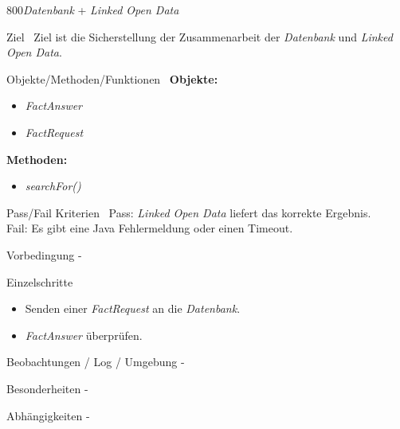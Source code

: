 \begin{testcase}{800}{\textit{Datenbank} + \textit{Linked Open Data}}

\item[Ziel]\
Ziel ist die Sicherstellung der Zusammenarbeit der \textit{Datenbank} und \textit{Linked Open Data}.
\item[Objekte/Methoden/Funktionen]\
\textbf{Objekte: }
\begin{itemize}
\item \textit{FactAnswer}
\item \textit{FactRequest}
\end{itemize}

\textbf{Methoden: }
\begin{itemize}
\item \textit{searchFor()}
\end{itemize}
\item[Pass/Fail Kriterien]\ 
Pass: \textit{Linked Open Data} liefert das korrekte Ergebnis.\\
Fail: Es gibt eine Java Fehlermeldung oder einen Timeout.
\item[Vorbedingung] -
\item[Einzelschritte]
\begin{itemize}
\item Senden einer \textit{FactRequest} an die \textit{Datenbank}.
\item \textit{FactAnswer} überprüfen.
\end{itemize} 
\item[Beobachtungen / Log / Umgebung] -
\item[Besonderheiten] -
\item[Abhängigkeiten] -

\end{testcase}

\pagebreak[2]

